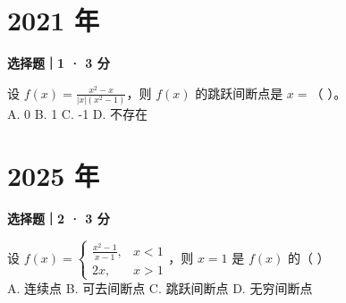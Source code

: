 

\section*{2021 年}


\textbf{选择题｜1 · 3 分}

设 $f(x) = \frac{x^2 - x}{|x|(x^2 - 1)}$，则 $f(x)$ 的跳跃间断点是 $x =$（ \quad ）。\\
A. 0 \quad B. 1 \quad C. -1 \quad D. 不存在


\section*{2025 年}


\textbf{选择题｜2 · 3 分}

设 $f(x) = \begin{cases} \frac{x^2-1}{x-1}, & x < 1 \\ 2x, & x > 1 \end{cases}$，则 $x = 1$ 是 $f(x)$ 的（ \quad ）\\
A. 连续点 \quad B. 可去间断点 \quad C. 跳跃间断点 \quad D. 无穷间断点
